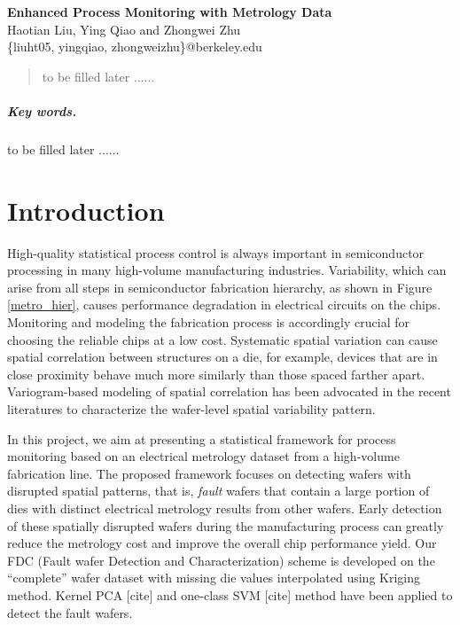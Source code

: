 \documentclass[12pt]{article}
\numberwithin{equation}{section}
\numberwithin{table}{section}
\numberwithin{figure}{section}
\begin{document}
\begin{center}
\textbf{\Large Enhanced Process Monitoring with Metrology Data} \\[6pt]
  Haotian Liu, Ying Qiao and Zhongwei Zhu \\[6pt]
  \{liuht05, yingqiao, zhongweizhu\}@berkeley.edu
\end{center}

\begin{abstract}
to be filled later ......
\end{abstract}

\subparagraph{Key words.} to be filled later ......


\section{Introduction}

\hspace{12 pt}
High-quality statistical process control is always important in
semiconductor processing in many high-volume manufacturing
industries\cite{DAC09}. Variability, which can arise from all steps in
semiconductor fabrication hierarchy, as shown in Figure \ref{metro_hier},
causes performance degradation 
in electrical circuits on the chips. Monitoring and modeling the
fabrication process is accordingly crucial for choosing the reliable 
chips at a low cost. Systematic spatial variation can cause spatial
correlation between structures on a die, for example, devices that are
in close proximity behave much more similarly than those spaced
farther apart\cite{KedarPHD}. Variogram-based modeling of spatial
correlation has been advocated in the recent literatures to
characterize the wafer-level spatial variability pattern. 


In this project, we aim at presenting a statistical framework for 
process monitoring based on an electrical metrology dataset from a
high-volume fabrication line. The proposed framework focuses on 
detecting wafers with disrupted spatial patterns, that is,
\emph{fault} wafers that contain a large portion of dies with distinct
electrical metrology results from other wafers. Early detection of
these spatially disrupted wafers during the manufacturing process can
greatly reduce the metrology cost and improve the overall chip performance yield.
Our FDC (Fault wafer Detection and Characterization) scheme is developed on the
``complete'' wafer dataset with missing die values interpolated using Kriging
method\cite{Cressie93}. Kernel PCA [cite] and one-class SVM [cite] method have
been applied to detect the fault wafers.   
\end{document}
